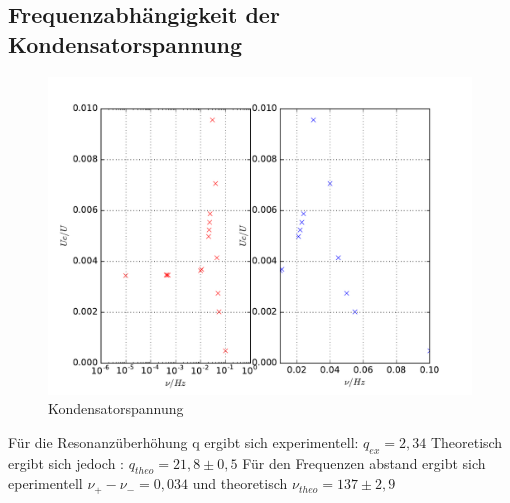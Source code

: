   \subsection{Frequenzabhängigkeit der Kondensatorspannung}
  \begin{figure}
    \centering
    \includegraphics[width=\textwidth]{./logos/5cplot.pdf}
      \caption{Kondensatorspannung}
      \label{fig:5cplot}
    \end{figure}
    Für die Resonanzüberhöhung q ergibt sich experimentell: $q_{ex}= 2,34 $
    Theoretisch ergibt sich jedoch : $q_{theo}= 21,8  \pm 0,5 $
    Für den Frequenzen abstand ergibt sich eperimentell $ \nu_+ - \nu_- = 0,034 $
    und theoretisch $ \nu_{theo}= 137 \pm 2,9$
